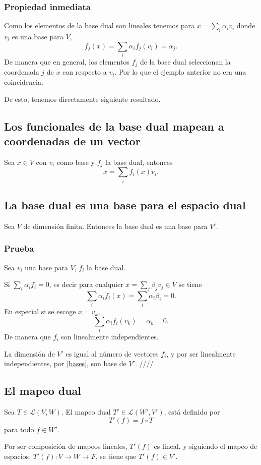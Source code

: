 \documentclass{article}
\begin{document}
\subsubsection{Propiedad inmediata}
Como los elementos de la base dual son lineales tenemos
para $x=\sum_i\alpha_i v_i$ donde $v_i$ es una base para $V$,
$$f_j(x)=\sum_i\alpha_i f_j(v_i) = \alpha_j.$$
De manera que en general, los elementos $f_j$ de la base dual
seleccionan la coordenada $j$ de $x$ con respecto a $v_i$. Por lo que
el ejemplo anterior no era una coincidencia.

De esto, tenemos directamente siguiente resultado.

\subsection{Los funcionales de la base dual mapean a coordenadas de un vector}
Sea $x\in V$ con $v_i$ como base y $f_j$ la base
dual, entonces
$$x = \sum_i f_i(x) v_i.$$

\subsection{La base dual es una base para el espacio dual}
Sea $V$ de dimensión finita. Entonces la base dual es una base para
$V'$.
\subsubsection*{Prueba}
Sea $v_i$ una base para $V$, $f_i$ la base dual.

Si $\sum_i\alpha_i f_i = 0$, es decir para cualquier
$x=\sum_j\beta_j v_j\in V$ se tiene
$$\sum_i\alpha_i f_i(x) = \sum_i\alpha_i \beta_i = 0.$$
En especial si se escoge $x=v_k$,
$$\sum_i\alpha_i f_i(v_k) = \alpha_k = 0.$$
De manera que $f_i$ son linealmente independientes.

La dimensión de $V'$ es igual al número de vectores $f_i$, y por
ser linealmente independientes, por \ref{bases}, son base de $V'$.
\hfill ////

\subsection{El mapeo dual}
Sea $T\in\mathcal{L}(V,W)$. El mapeo dual $T'\in\mathcal{L}(W',V')$,
está definido por
$$T'(f) = f\circ T$$
para todo $f\in W'$.

Por ser composición de mapeos lineales, $T'(f)$ es lineal,
y siguiendo el mapeo de espacios,
$T'(f):V\rightarrow W\rightarrow F$, se tiene que $T'(f)\in V'$.
\end{document}
